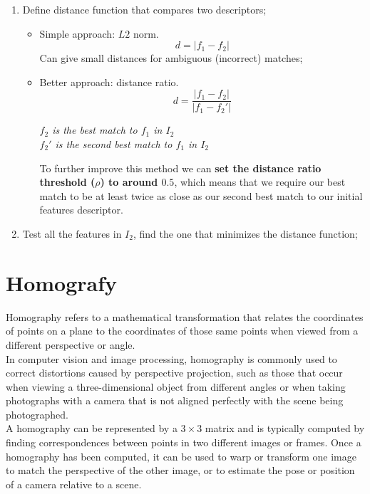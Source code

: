 \documentclass{article}
\begin{document}
\begin{enumerate}
    \item Define distance function that compares two descriptors;
    \begin{itemize}
        \item Simple approach: $L2$ norm.
        \begin{equation*}
            d = |f_1 - f_2|
        \end{equation*}
        Can give small distances for ambiguous (incorrect) matches;
        \item Better approach: distance ratio.
        \begin{equation*}
            d = \frac{|f_1 - f_2|}{|f_1 - f_2'|}
        \end{equation*}
        \begin{center}
            \textit{$f_2$ is the best match to $f_1$ in $I_2$} \\
            \textit{$f_2'$ is the second best match to $f_1$ in $I_2$}
        \end{center}
        To further improve this method we can \textbf{set the distance ratio threshold ($\rho$) to around $0.5$}, which means that we require our best match to be at least twice as close as our second best match to our initial features descriptor. 
    \end{itemize}
    \item Test all the features in $I_2$, find the one that minimizes the distance function;
\end{enumerate}

\newpage

\section*{Homografy}

Homography refers to a mathematical transformation that relates the coordinates of points on a plane to the coordinates of those same points when viewed from a different perspective or angle. \\

In computer vision and image processing, homography is commonly used to correct distortions caused by perspective projection, such as those that occur when viewing a three-dimensional object from different angles or when taking photographs with a camera that is not aligned perfectly with the scene being photographed. \\

A homography can be represented by a $3\times3$ matrix and is typically computed by finding correspondences between points in two different images or frames. Once a homography has been computed, it can be used to warp or transform one image to match the perspective of the other image, or to estimate the pose or position of a camera relative to a scene.
\end{document}
